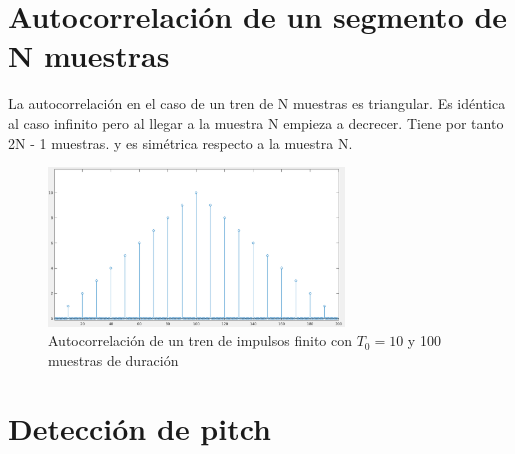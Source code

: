 \documentclass[12pt]{article}
\begin{document}
\section{Autocorrelación de un segmento de N muestras}
La autocorrelación en el caso de un tren de N muestras es triangular. Es idéntica al caso infinito pero al llegar a la muestra N empieza a decrecer. Tiene por tanto 2N - 1 muestras. y es simétrica respecto a la muestra N.

\begin{figure}[H]
	\centering
	\includegraphics[width=0.7\textwidth]{autocorr_tren_finito.png}
	\caption{Autocorrelación de un tren de impulsos finito con $T_0 = 10$ y 100 muestras de duración}
	
\end{figure}


\section{Detección de pitch}

%
\end{document}
